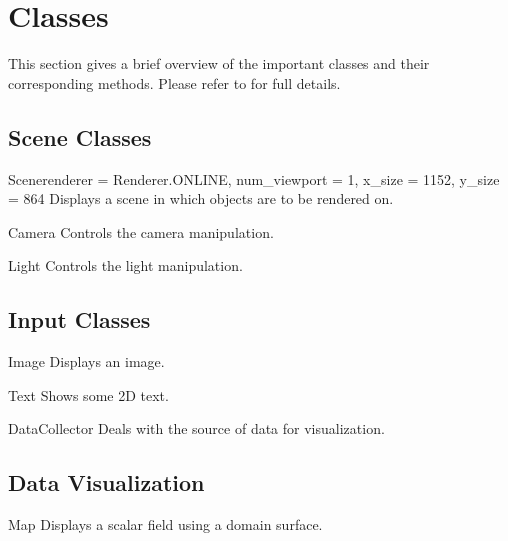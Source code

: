 \section{\pyvisi Classes}
This section gives a brief overview of the important classes and their 
corresponding methods. Please refer to \ReferenceGuide for full details.
\subsection{Scene Classes}
\begin{classdesc}{Scene}{renderer = Renderer.ONLINE, num_viewport = 1, 
x_size = 1152, y_size = 864}
Displays a scene in which objects are to be rendered on.
\end{classdesc}

\begin{classdesc}{Camera}{}
 Controls the camera manipulation. 
\end{classdesc}

\begin{classdesc}{Light}{}
 Controls the light manipulation.
\end{classdesc}

\subsection{Input Classes}

\begin{classdesc}{Image}{}
 Displays an image.
\end{classdesc}

\begin{classdesc}{Text}{}
 Shows some 2D text.
\end{classdesc}

\begin{classdesc}{DataCollector}{}
Deals with the source of data for visualization.
\end{classdesc}

\subsection{Data Visualization}
\begin{classdesc}{Map}{}
 Displays a scalar field using a domain surface.
\end{classdesc}

